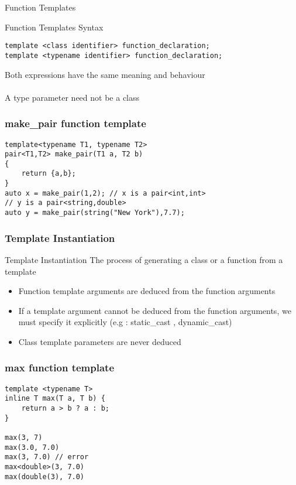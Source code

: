 \documentclass{beamer}
\begin{document}
\begin{frame}[fragile]{Function Templates}

\begin{block}{Function Templates Syntax}
\begin{lstlisting}
template <class identifier> function_declaration;
template <typename identifier> function_declaration;
\end{lstlisting}
\end{block}

Both expressions have the same meaning and behaviour\\~\\

A type parameter need not be a class
\end{frame}

\begin{frame}[fragile]
\frametitle{make\_pair function template}

\begin{lstlisting}
template<typename T1, typename T2>
pair<T1,T2> make_pair(T1 a, T2 b)
{
    return {a,b};
}
auto x = make_pair(1,2); // x is a pair<int,int>
// y is a pair<string,double>
auto y = make_pair(string("New York"),7.7); 

\end{lstlisting}
\end{frame}


\begin{frame}
\frametitle{Template Instantiation}

\begin{block}{Template Instantiation}
The process of generating a class or a function from a template
\end{block}
\begin{itemize}
\item Function template arguments are deduced from the function arguments
\item If a template argument cannot be deduced from the function arguments, we must specify
it explicitly (e.g : static\_cast , dynamic\_cast)
\item Class template parameters are never deduced
\end{itemize}
\end{frame}


\begin{frame}[fragile]
\frametitle{max function template}

\begin{lstlisting}
template <typename T>
inline T max(T a, T b) {
    return a > b ? a : b;
}

max(3, 7)
max(3.0, 7.0)
max(3, 7.0) // error
max<double>(3, 7.0)
max(double(3), 7.0)
\end{lstlisting}

\end{frame}
\end{document}
